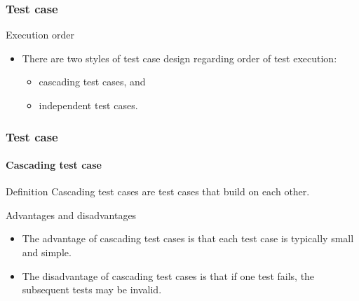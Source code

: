 \begin{frame}
\frametitle{Test case}

\begin{block:fact}{Execution order}
\begin{itemize}
    \item There are two styles of test case design regarding order of test
    execution:
	\begin{itemize}
		\item cascading test cases, and
		\item independent test cases.
	\end{itemize}
\end{itemize}
\end{block:fact}
\end{frame}


\begin{frame}
\label{concept:cascading-test-case}
\frametitle{Test case}
\framesubtitle{Cascading test case}

\begin{block:concept}{Definition}
Cascading test cases are test cases that build on each other.
\end{block:concept}


\begin{block:fact}{Advantages and disadvantages}
\begin{itemize}
	\item The advantage of cascading test cases is that each test case is
	typically small and simple.

	\item The disadvantage of cascading test cases is that if one test fails,
	the subsequent tests may be invalid.
\end{itemize}
\end{block:fact}

\hfill
{}
\end{frame}



